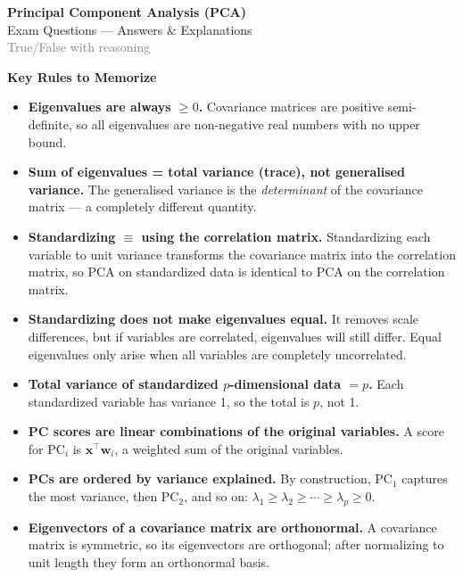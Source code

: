 \documentclass[12pt, a4paper]{article}
\newenvironment{notebox}{%
  \begin{mdframed}[backgroundcolor=notebg, linecolor=noteborder, linewidth=1.5pt, leftline=true, rightline=false, topline=false, bottomline=false, innerleftmargin=10pt, innerrightmargin=10pt, innertopmargin=8pt, innerbottommargin=8pt]
}{\end{mdframed}}
\begin{document}
\begin{center}
  {\LARGE \textbf{Principal Component Analysis (PCA)}}\\[0.4em]
  {\large Exam Questions --- Answers \& Explanations}\\[0.2em]
  \textcolor{gray}{\small True/False with reasoning}
\end{center}

\vspace{1em}

\begin{notebox}
\textbf{Key Rules to Memorize}
\begin{itemize}[leftmargin=1.5em, itemsep=3pt]
  \item \textbf{Eigenvalues are always $\geq 0$.} Covariance matrices are positive semi-definite, so all eigenvalues are non-negative real numbers with no upper bound.
  \item \textbf{Sum of eigenvalues = total variance (trace), not generalised variance.} The generalised variance is the \textit{determinant} of the covariance matrix --- a completely different quantity.
  \item \textbf{Standardizing $\equiv$ using the correlation matrix.} Standardizing each variable to unit variance transforms the covariance matrix into the correlation matrix, so PCA on standardized data is identical to PCA on the correlation matrix.
  \item \textbf{Standardizing does not make eigenvalues equal.} It removes scale differences, but if variables are correlated, eigenvalues will still differ. Equal eigenvalues only arise when all variables are completely uncorrelated.
  \item \textbf{Total variance of standardized $p$-dimensional data $= p$.} Each standardized variable has variance 1, so the total is $p$, not 1.
  \item \textbf{PC scores are linear combinations of the original variables.} A score for PC$_i$ is $\mathbf{x}^\top \mathbf{w}_i$, a weighted sum of the original variables.
  \item \textbf{PCs are ordered by variance explained.} By construction, PC$_1$ captures the most variance, then PC$_2$, and so on: $\lambda_1 \geq \lambda_2 \geq \cdots \geq \lambda_p \geq 0$.
  \item \textbf{Eigenvectors of a covariance matrix are orthonormal.} A covariance matrix is symmetric, so its eigenvectors are orthogonal; after normalizing to unit length they form an orthonormal basis.
\end{itemize}
\end{notebox}
\end{document}
